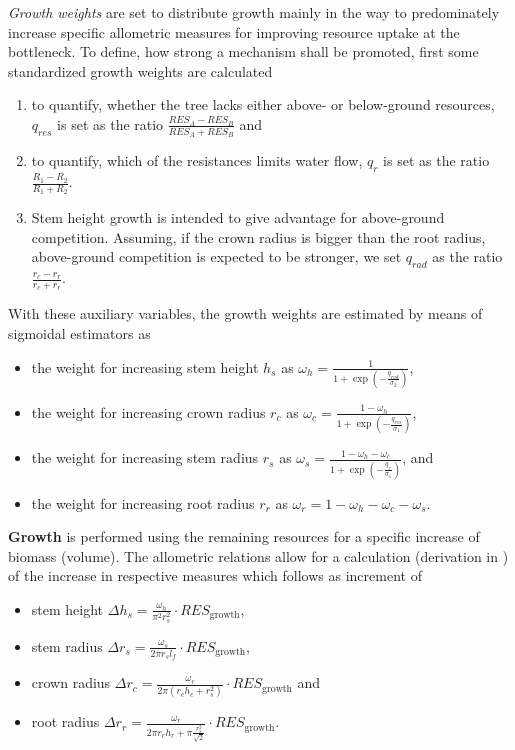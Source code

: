 \textit{Growth weights}
are set to distribute growth mainly in the way to predominately increase specific allometric measures for improving resource uptake at the bottleneck.
To define, how strong a mechanism shall be promoted, first some standardized growth weights are calculated
\begin{enumerate}
\item to quantify, whether the tree lacks either above- or below-ground resources,
$q_{res}$ is set as the ratio
$\frac{RES_A - RES_B}{RES_A + RES_B}$ and 
\item to quantify, which of the resistances limits water flow, $q_r$ is set as the ratio $\frac{R_1 - R_2}{R_1 + R_2}$.
\item Stem height growth is intended to give advantage for above-ground competition.
Assuming, if the crown radius is bigger than the root radius, above-ground competition is expected to be stronger, we set $q_{rad}$ as the ratio $\frac{r_c - r_r}{r_c + r_r}$.
\end{enumerate}
With these auxiliary variables, the growth weights are estimated by means of sigmoidal estimators as
\begin{itemize}
\item the weight for increasing stem height $h_s$ as 
$\omega_h = \frac{1}{1 + \exp\left(-\frac{q_{rad}}{\sigma_2}\right)}$,
\item the weight for increasing crown radius $r_c$ as 
$\omega_c = \frac{1 - \omega_h}{1 + \exp\left(-\frac{q_{res}}{\sigma_1}\right)}$,
\item the weight for increasing stem radius $r_s$ as 
$\omega_s = \frac{1 - \omega_h-\omega_c}{1 + \exp\left(-\frac{q_r}{\sigma_1}\right)}$, and
\item the weight for increasing root radius $r_r$ as 
$\omega_r = 1 - \omega_h-\omega_c - \omega_s$.
\end{itemize}
\textbf{Growth} is performed using the remaining resources for a specific increase of biomass (volume).
The allometric relations allow for a calculation (derivation in \citet{Ronny2014}) of the increase in respective measures which follows as increment of
\begin{itemize}
\item stem height $\Delta h_s = \frac{\omega_h }{\pi^2 r_s^2}\cdot RES_{\text{growth}}$,
\item stem radius $\Delta r_s = \frac{\omega_s}{2\pi r_s l_f}\cdot RES_{\text{growth}}$,
\item crown radius $\Delta r_c = \frac{\omega_c }{2\pi \left(r_c h_c + r_s^2\right)}\cdot RES_{\text{growth}}$ and
\item root radius $\Delta r_r = \frac{\omega_r}{2 \pi r_r h_r + \pi \frac{r_s^2}{\sqrt{2}}}\cdot RES_{\text{growth}}$.
\end{itemize}

